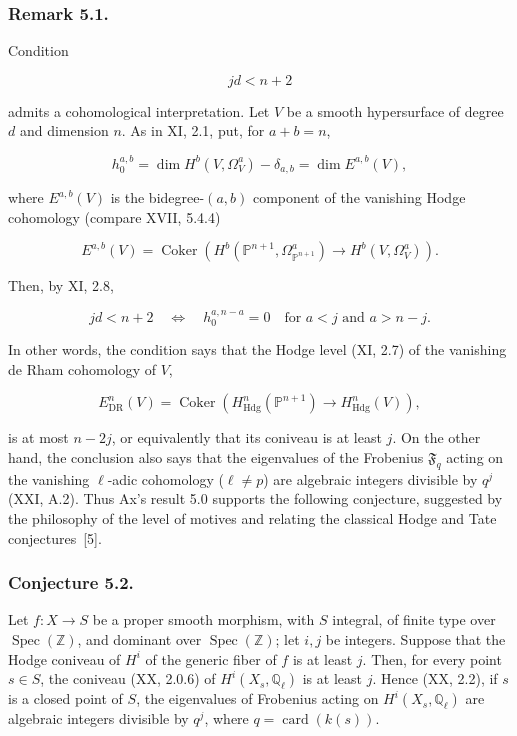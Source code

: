 \subsubsection*{Remark 5.1.}
Condition

\begin{equation}\tag{5.1.1}
jd<n+2
\end{equation}

admits a cohomological interpretation.  Let $V$ be a smooth hypersurface of
degree $d$ and dimension $n$.  As in XI, 2.1, put, for $a+b=n$,

\begin{equation}\tag{5.1.2}
h_0^{a,b}
=\dim H^b(V,\Omega_V^a)-\delta_{a,b}
=\dim E^{a,b}(V),
\end{equation}

where $E^{a,b}(V)$ is the bidegree-$(a,b)$ component of the vanishing Hodge
cohomology (compare XVII, 5.4.4)

\begin{equation}\tag{5.1.3}
E^{a,b}(V)
=\operatorname{Coker}\!\left(
H^b(\mathbb P^{n+1},\Omega_{\mathbb P^{n+1}}^a)
\longrightarrow H^b(V,\Omega_V^a)\right).
\end{equation}

Then, by XI, 2.8,

\begin{equation}\tag{5.1.4}
jd<n+2
\quad\Longleftrightarrow\quad
h_0^{a,n-a}=0\quad\text{for }a<j\text{ and }a>n-j.
\end{equation}

In other words, the condition says that the Hodge level (XI, 2.7) of the
vanishing de Rham cohomology of $V$,

\[
E_{\mathrm{DR}}^n(V)
=\operatorname{Coker}\!\left(
H_{\mathrm{Hdg}}^n(\mathbb P^{n+1})
\longrightarrow H_{\mathrm{Hdg}}^n(V)\right),
\]

is at most $n-2j$, or equivalently that its coniveau is at least $j$.
On the other hand, the conclusion also says that the eigenvalues of the
Frobenius $\mathfrak F_q$ acting on the vanishing $\ell$-adic cohomology
($\ell\ne p$) are algebraic integers divisible by $q^j$ (XXI, A.2).
Thus Ax's result 5.0 supports the following conjecture, suggested by the
philosophy of the level of motives and relating the classical Hodge and
Tate conjectures~[5].

\subsubsection*{Conjecture 5.2.}
Let $f:X\to S$ be a proper smooth morphism, with $S$ integral, of finite
type over $\operatorname{Spec}(\mathbb Z)$, and dominant over
$\operatorname{Spec}(\mathbb Z)$; let $i,j$ be integers.  Suppose that the
Hodge coniveau of $H^i$ of the generic fiber of $f$ is at least $j$.  Then,
for every point $s\in S$, the coniveau (XX, 2.0.6) of
$H^i(X_s,\mathbb Q_\ell)$ is at least $j$.  Hence (XX, 2.2), if $s$ is a
closed point of $S$, the eigenvalues of Frobenius acting on
$H^i(X_s,\mathbb Q_\ell)$ are algebraic integers divisible by $q^j$, where
$q=\operatorname{card}(k(s))$.

